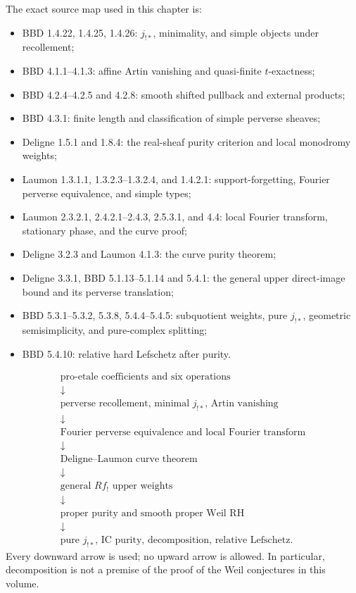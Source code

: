 The exact source map used in this chapter is:
\begin{itemize}
\item BBD 1.4.22, 1.4.25, 1.4.26:
      \(j_{!*}\), minimality, and simple objects under recollement;
\item BBD 4.1.1--4.1.3:
      affine Artin vanishing and quasi-finite \(t\)-exactness;
\item BBD 4.2.4--4.2.5 and 4.2.8:
      smooth shifted pullback and external products;
\item BBD 4.3.1:
      finite length and classification of simple perverse sheaves;
\item Deligne 1.5.1 and 1.8.4:
      the real-sheaf purity criterion and local monodromy weights;
\item Laumon 1.3.1.1, 1.3.2.3--1.3.2.4, and 1.4.2.1:
      support-forgetting, Fourier perverse equivalence, and simple types;
\item Laumon 2.3.2.1, 2.4.2.1--2.4.3, 2.5.3.1, and 4.4:
      local Fourier transform, stationary phase, and the curve proof;
\item Deligne 3.2.3 and Laumon 4.1.3:
      the curve purity theorem;
\item Deligne 3.3.1, BBD 5.1.13--5.1.14 and 5.4.1:
      the general upper direct-image bound and its perverse translation;
\item BBD 5.3.1--5.3.2, 5.3.8, 5.4.4--5.4.5:
      subquotient weights, pure \(j_{!*}\), geometric semisimplicity, and
      pure-complex splitting;
\item BBD 5.4.10:
      relative hard Lefschetz after purity.
\end{itemize}

\begin{auditbox}[title={Acyclic theorem order}]
\[
\begin{array}{c}
\text{pro-etale coefficients and six operations}\\
\downarrow\\
\text{perverse recollement, minimal \(j_{!*}\), Artin vanishing}\\
\downarrow\\
\text{Fourier perverse equivalence and local Fourier transform}\\
\downarrow\\
\text{Deligne--Laumon curve theorem}\\
\downarrow\\
\text{general \(Rf_!\) upper weights}\\
\downarrow\\
\text{proper purity and smooth proper Weil RH}\\
\downarrow\\
\text{pure \(j_{!*}\), IC purity, decomposition, relative Lefschetz}.
\end{array}
\]
Every downward arrow is used; no upward arrow is allowed.  In particular,
decomposition is not a premise of the proof of the Weil conjectures in this
volume.
\end{auditbox}

